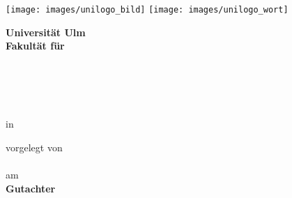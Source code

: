 \begin{titlepage}
\textwidth28cm
\texttt{[image: images/unilogo\_bild]}
\hfill
\texttt{[image: images/unilogo\_wort]}\\[1em]
\begin{center} 
{\large\bfseries Universität Ulm\\
	\vspace{0.5cm}
   Fakultät für \fakultaet\\
}
\vspace{0.5cm}
{\large \institut\\
}
\begin{figure}[h]
\centering

\end{figure}
\vspace{2cm}
{\LARGE\bfseries
\titel\\ %
}
\vspace{1cm}
{\Large
\type}\\
\mbox{}\\
\mbox{in \studiengang}
\end{center}
\vspace{1cm}
\begin{center}
vorgelegt von \\
\mbox{\fullname} \\
am \mbox{\datum}\\

\vspace*{2.2cm} %
{\textbf{Gutachter}} \\
\mbox{}\\
\mbox{\gutachterA}\\
\end{center}
\vfill
\end{titlepage}

\newpage\thispagestyle{empty}

